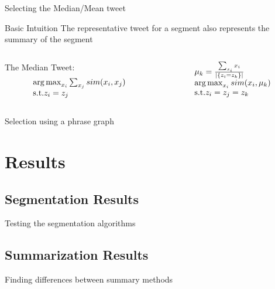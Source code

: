 \documentclass[compress]{beamer}
\DeclareMathOperator*{\argmax}{arg\,max}
\begin{document}
\begin{frame}{Selecting the Median/Mean tweet}
\begin{block}{Basic Intuition}
The representative tweet for a segment also represents the summary of the segment
\end{block}

\begin{columns}

\begin{column}[1]{5cm}
The Median Tweet:
\[
\begin{array}{l l}
\argmax_{x_i} \sum_{x_j} sim(x_i, x_j) \\
\text{s.t.} z_i = z_j \\
\end{array}
\]
\end{column}

\begin{column}[2]{5cm}
\[
\begin{array}{l l}
\mu_k = \frac{\sum_{x_i} x_i}{|\{z_i = z_k\}|} \\
\argmax_{x_i} sim(x_i, \mu_k) \\
\text{s.t.} z_i = z_j = z_k \\
\end{array}
\]
\end{column}

\end{columns}

\end{frame}

\begin{frame}{Selection using a phrase graph}
\end{frame}

\section{Results}
\subsection{Segmentation Results}

\begin{frame}{Testing the segmentation algorithms}
\end{frame}

\subsection{Summarization Results}
\begin{frame}{Finding differences between summary methods}
\end{frame}
\end{document}
